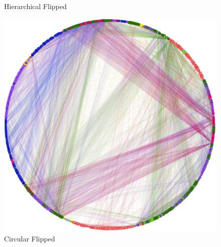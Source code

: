 \begin{figure}[p]
\centering
{}
\caption{Hierarchical Flipped}\label{fig:oot:hierflip}
\end{figure}

\begin{figure}[p]
\centering
\includegraphics[height=0.45\textheight]{img/oot/circular_flipped}
\caption{Circular Flipped}\label{fig:oot:circleflip}
\end{figure}

